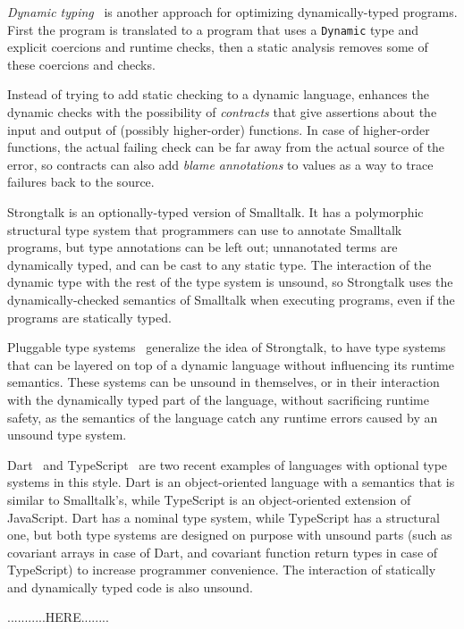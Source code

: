 \documentclass[preprint]{sig-alternate}
\begin{document}
\textit{Dynamic typing}~\citep{henglein1994dts} is
another approach for optimizing dynamically-typed programs.
First the program is translated to a program that uses
a {\tt Dynamic} type and explicit coercions and runtime checks,
then a static analysis removes some  of these coercions and
checks.

Instead of trying to add static checking to a dynamic
language, \citet{findler2002chf} enhances
the dynamic checks with the possibility of {\em contracts}
that give assertions about the input and output of (possibly
higher-order) functions. In case of higher-order functions,
the actual failing check can be far away from the actual
source of the error, so contracts can also add {\em blame
annotations} to values as a way to trace failures back to
the source.

Strongtalk \citep{bracha1993strongtalk,bracha1996strongtalk} is
an optionally-typed version of Smalltalk. It has a
polymorphic structural type system that programmers can use
to annotate Smalltalk programs, but type annotations can be
left out; unnanotated terms are dynamically typed, and can
be cast to any static type. The interaction of the dynamic
type with the rest of the type system is unsound, so
Strongtalk uses the dynamically-checked semantics of
Smalltalk when executing programs, even if the programs
are statically typed.

Pluggable type systems~\citep{bracha2004pluggable} generalize
the idea of Strongtalk, to have type systems that can be
layered on top of a dynamic language without influencing
its runtime semantics. These systems can be unsound in
themselves, or in their interaction with the dynamically
typed part of the language, without sacrificing runtime
safety, as the semantics of the language catch any
runtime errors caused by an unsound type system.

Dart~\citep{dart} and TypeScript~\citep{typescript} are
two recent examples of languages with optional type systems
in this style. Dart is an object-oriented language with
a semantics that is similar to Smalltalk's, while TypeScript
is an object-oriented extension of JavaScript. Dart has a
nominal type system, while TypeScript has a structural one,
but both type systems are designed on purpose with unsound
parts (such as covariant arrays in case of Dart, and
covariant function return types in case of TypeScript) to
increase programmer convenience. The interaction of
statically and dynamically typed code is also unsound.

...........HERE........
\end{document}
